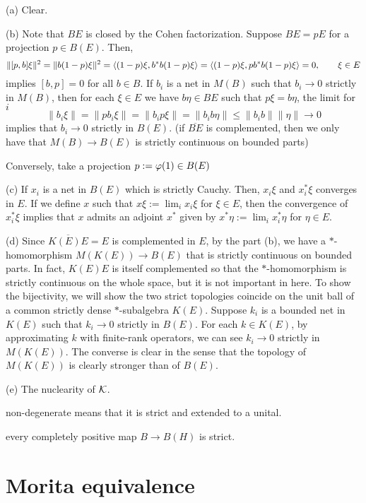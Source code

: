 \documentclass{../../large}
\begin{document}
\begin{pf}
(a)
Clear.

(b)
Note that $BE$ is closed by the Cohen factorization.
Suppose $BE=pE$ for a projection $p\in B(E)$.
Then,
\[\|[p,b]\xi\|^2=\|b(1-p)\xi\|^2=\langle(1-p)\xi,b^*b(1-p)\xi\rangle=\langle(1-p)\xi,pb^*b(1-p)\xi\rangle=0,\qquad\xi\in E\]
implies $[b,p]=0$ for all $b\in B$.
If $b_i$ is a net in $M(B)$ such that $b_i\to0$ strictly in $M(B)$, then for each $\xi\in E$ we have $b\eta\in BE$ such that $p\xi=b\eta$, the limit for $i$
\[\|b_i\xi\|=\|pb_i\xi\|=\|b_ip\xi\|=\|b_ib\eta\|\le\|b_ib\|\|\eta\|\to0\]
implies that $b_i\to0$ strictly in $B(E)$.
(if $\overline{BE}$ is complemented, then we only have that $M(B)\to B(E)$ is strictly continuous on bounded parts)

Conversely, take a projection $p:=\varphi(1)\in B(E)$


(c)
If $x_i$ is a net in $B(E)$ which is strictly Cauchy.
Then, $x_i\xi$ and $x_i^*\xi$ converges in $E$.
If we define $x$ such that $x\xi:=\lim_ix_i\xi$ for $\xi\in E$, then the convergence of $x_i^*\xi$ implies that $x$ admits an adjoint $x^*$ given by $x^*\eta:=\lim_ix_i^*\eta$ for $\eta\in E$.

(d)
Since $\overline{K(E)E}=E$ is complemented in $E$, by the part (b), we have a $*$-homomorphism $M(K(E))\to B(E)$ that is strictly continuous on bounded parts.
In fact, $K(E)E$ is itself complemented so that the $*$-homomorphism is strictly continuous on the whole space, but it is not important in here.
To show the bijectivity, we will show the two strict topologies coincide on the unit ball of a common strictly dense $*$-subalgebra $K(E)$.
Suppose $k_i$ is a bounded net in $K(E)$ such that $k_i\to0$ strictly in $B(E)$.
For each $k\in K(E)$, by approximating $k$ with finite-rank operators, we can see $k_i\to0$ strictly in $M(K(E))$.
The converse is clear in the sense that the topology of $M(K(E))$ is clearly stronger than of $B(E)$.


(e)
The nuclearity of $\mathcal{K}$.
\end{pf}




\begin{prb}
non-degenerate means that it is strict and extended to a unital.

every completely positive map $B\to B(H)$ is strict.
\end{prb}




\section{Morita equivalence}
\end{document}
